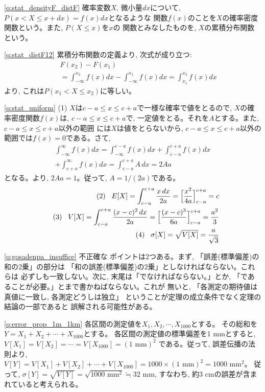 \ref{q:stat_densityF_distF}  
確率変数$X$, 微小量$dx$について, $P(x<X\le x+dx)=f(x)dx$となるような
関数$f(x)$のことを$X$の確率密度関数という。また, $P(X\leq x)$を$x$の
関数とみなしたものを, $X$の累積分布関数という。
\mv

\ref{q:stat_distF12}  累積分布関数の定義より, 次式が成り立つ:
\begin{eqnarray*}&&F(x_2)-F(x_1)\\
&&=\int_{-\infty}^{x_2}f(x)dx-\int_{-\infty}^{x_1}f(x)dx=\int_{x_1}^{x_2}f(x)dx\end{eqnarray*}
より, これは$P(x_1<X\leq x_2)$に等しい。
\mv

\ref{q:stat_uniform}  
(1) $X$は$c-a\leq x\leq c+a$で一様な確率で値をとるので, $X$の確率密度関数$f(x)$は, 
$c-a\leq x\leq c+a$で, 一定値をとる。それを$A$とする。また, $c-a\leq x\leq c+a$以外の範囲
には$X$は値をとらないから, $c-a\leq x\leq c+a$以外の範囲では$f(x)=0$である。さて, 
\begin{eqnarray*}
\int_{-\infty}^{\infty}f(x)dx=\int_{-\infty}^{c-a}f(x)dx+\int_{c-a}^{c+a}f(x)dx\\
+\int_{c+a}^{\infty}f(x)dx=\int_{c-a}^{c+a}A\,dx=2Aa
\end{eqnarray*}
となる。より, $2Aa=1$。従って, $A=1/(2a)$である。
\begin{eqnarray*}
&&\text{(2) }\,\,\,E[X]=\int_{c-a}^{c+a}\frac{x\,dx}{2a}=\Bigl[\frac{x^2}{4a}\Bigr]_{c-a}^{c+a}=c\\
&&\text{(3) }\,\,\,V[X]=\int_{c-a}^{c+a}\frac{(x-c)^2\,dx}{2a}=\Bigl[\frac{(x-c)^3}{6a}\Bigr]_{c-a}^{c+a}=\frac{a^2}{3}\\
&&\text{(4) }\,\,\,\sigma[X]=\sqrt{V[X]}=\frac{a}{\sqrt{3}}
\end{eqnarray*}
\mv

\ref{q:gosadenpa_insuffice} 不正確な
ポイントは2つある。まず, 「誤差(標準偏差)の和の2乗」の部分は
「和の誤差(標準偏差)の2乗」としなければならない。これらは
必ずしも一致しない。次に, 末尾は「でなければならない。」とか, 
「であることが必要。」とまで書かねばならない。これが
無いと, 「各測定の期待値は真値に一致し, 各測定どうしは独立」
ということが定理の成立条件でなく定理の結論の一部であると
誤解される可能性がある。
\vv


%
\ref{q:error_prop_1m_1km}
各区間の測定値を$X_1, X_2, \cdots, X_{1000}$とする。
その総和を$Y=X_1+X_2+ \cdots +X_{1000}$とする。
各区間の測定値の標準偏差を1 mmとすると, 
$V[X_1]=V[X_2]=\cdots=V[X_{1000}]=(1\,\,\text{mm})^2$
である。従って, 誤差伝播の法則より, $V[Y]=V[X_1]+V[X_2]+\cdots+V[X_{1000}]
=1000\times(1\,\,\text{mm})^2=1000\,\,\text{mm}^2$。
従って, $\sigma[Y]=\sqrt{V[Y]}=\sqrt{1000\,\,\text{mm}^2}\fallingdotseq 32\,\,\text{mm}$, 
すなわち, 約3 cmの誤差が含まれていると考えられる。
\mv

